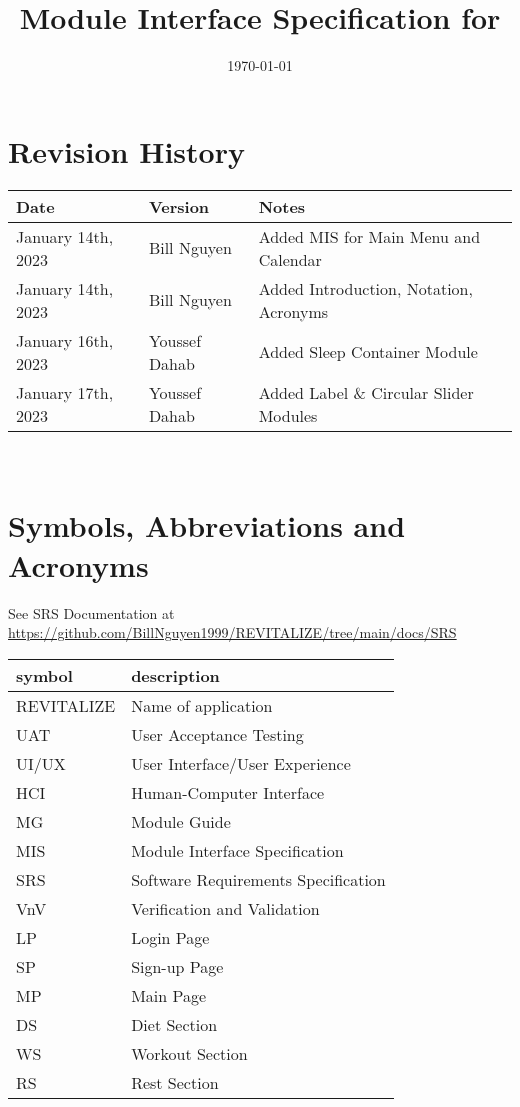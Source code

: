 \documentclass[12pt, titlepage]{article}
\begin{document}
\title{Module Interface Specification for \progname{}}

\author{\authname}

\date{\today}

\maketitle


\section{Revision History}

\begin{tabularx}{\textwidth}{p{3cm}p{2cm}X}
	\toprule {\bf Date} & {\bf Version} & {\bf Notes}\\
	\midrule
	January 14th, 2023 & Bill Nguyen  & Added MIS for Main Menu and Calendar\\
	January 14th, 2023 & Bill Nguyen  & Added Introduction, Notation, Acronyms\\
	January 16th, 2023 & Youssef Dahab & Added Sleep Container Module\\
	January 17th, 2023 & Youssef Dahab & Added Label \& Circular Slider Modules\\
	\bottomrule
\end{tabularx}

~\newpage

\section{Symbols, Abbreviations and Acronyms}

See SRS Documentation at \url{https://github.com/BillNguyen1999/REVITALIZE/tree/main/docs/SRS}

\renewcommand{\arraystretch}{1.2}
\begin{tabular}{l l} 
	\toprule		
	\textbf{symbol} & \textbf{description}\\
	\midrule 
	REVITALIZE & Name of application\\
	UAT & User Acceptance Testing\\
	UI/UX & User Interface/User Experience\\
	HCI & Human-Computer Interface\\
	MG & Module Guide\\
	MIS & Module Interface Specification\\
	SRS & Software Requirements Specification\\
	VnV & Verification and Validation\\
	LP & Login Page\\
	SP & Sign-up Page\\
	MP & Main Page\\
	DS & Diet Section\\
	WS & Workout Section\\
	RS & Rest Section\\
	\bottomrule
\end{tabular}\\
\end{document}
